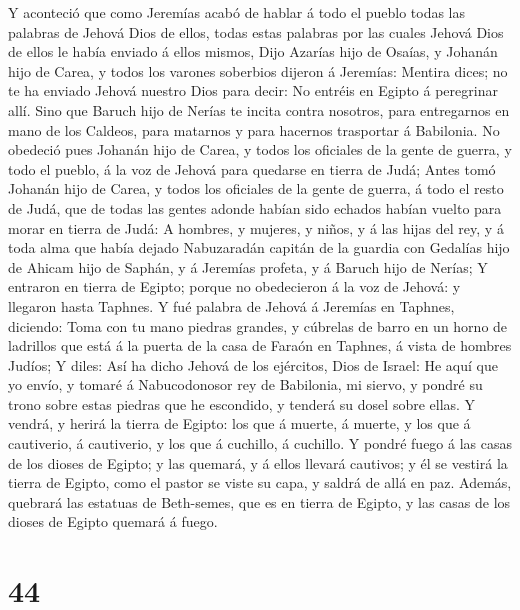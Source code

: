  Y aconteció que como Jeremías acabó de hablar á todo el
pueblo todas las palabras de Jehová Dios de ellos, todas estas palabras
por las cuales Jehová Dios de ellos le había enviado á ellos mismos,
 Dijo Azarías hijo de Osaías, y Johanán hijo de Carea, y
todos los varones soberbios dijeron á Jeremías: Mentira dices; no te ha
enviado Jehová nuestro Dios para decir: No entréis en Egipto á
peregrinar allí.  Sino que Baruch hijo de Nerías te incita
contra nosotros, para entregarnos en mano de los Caldeos, para matarnos
y para hacernos trasportar á Babilonia.  No obedeció pues
Johanán hijo de Carea, y todos los oficiales de la gente de guerra, y
todo el pueblo, á la voz de Jehová para quedarse en tierra de Judá;
 Antes tomó Johanán hijo de Carea, y todos los oficiales
de la gente de guerra, á todo el resto de Judá, que de todas las gentes
adonde habían sido echados habían vuelto para morar en tierra de Judá:
 A hombres, y mujeres, y niños, y á las hijas del rey, y á
toda alma que había dejado Nabuzaradán capitán de la guardia con
Gedalías hijo de Ahicam hijo de Saphán, y á Jeremías profeta, y á Baruch
hijo de Nerías;  Y entraron en tierra de Egipto; porque no
obedecieron á la voz de Jehová: y llegaron hasta Taphnes. 
Y fué palabra de Jehová á Jeremías en Taphnes, diciendo: 
Toma con tu mano piedras grandes, y cúbrelas de barro en un horno de
ladrillos que está á la puerta de la casa de Faraón en Taphnes, á vista
de hombres Judíos;  Y diles: Así ha dicho Jehová de los
ejércitos, Dios de Israel: He aquí que yo envío, y tomaré á
Nabucodonosor rey de Babilonia, mi siervo, y pondré su trono sobre estas
piedras que he escondido, y tenderá su dosel sobre ellas.
 Y vendrá, y herirá la tierra de Egipto: los que á
muerte, á muerte, y los que á cautiverio, á cautiverio, y los que á
cuchillo, á cuchillo.  Y pondré fuego á las casas de los
dioses de Egipto; y las quemará, y á ellos llevará cautivos; y él se
vestirá la tierra de Egipto, como el pastor se viste su capa, y saldrá
de allá en paz.  Además, quebrará las estatuas de
Beth-semes, que es en tierra de Egipto, y las casas de los dioses de
Egipto quemará á fuego.

\hypertarget{section-43}{%
\section{44}\label{section-43}}

